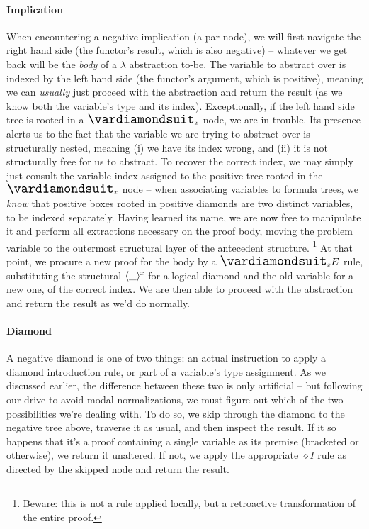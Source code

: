 \paragraph{Implication} When encountering a negative implication (a par node), we will first navigate the right hand side (the functor's result, which is also negative) -- whatever we get back will be the \textit{body} of a $\lambda$ abstraction to-be.
The variable to abstract over is indexed by the left hand side (the functor's argument, which is positive), meaning we can \textit{usually} just proceed with the abstraction and return the result (as we know both the variable's type and its index).
Exceptionally, if the left hand side tree is rooted in a $\dxdia{x}$ node, we are in trouble.
Its presence alerts us to the fact that the variable we are trying to abstract over is structurally nested, meaning (i) we have its index wrong, and (ii) it is not structurally free for us to abstract.
To recover the correct index, we may simply just consult the variable index assigned to the positive tree rooted in the $\dxdia{x}$ node -- when associating variables to formula trees, we \textit{know} that positive boxes rooted in positive diamonds are two distinct variables, to be indexed separately.
Having learned its name, we are now free to manipulate it and perform all extractions necessary on the proof body, moving the problem variable to the outermost structural layer of the antecedent structure.%
	\footnote{Beware: this is not a rule applied locally, but a retroactive transformation of the entire proof.}
At that point, we procure a new proof for the body by a $\dxdia{x}E$ rule, substituting the structural $\dbra{\_}{x}$ for a logical diamond and the old variable for a new one, of the correct index.
We are then able to proceed with the abstraction and return the result as we'd do normally.

\paragraph{Diamond} 
A negative diamond is one of two things: an actual instruction to apply a diamond introduction rule, or part of a variable's type assignment.
As we discussed earlier, the difference between these two is only artificial -- but following our drive to avoid modal normalizations, we must figure out which of the two possibilities we're dealing with.
To do so, we skip through the diamond to the negative tree above, traverse it as usual, and then inspect the result.
If it so happens that it's a proof containing a single variable as its premise (bracketed or otherwise), we return it unaltered.
If not, we apply the appropriate $\diamond I$ rule as directed by the skipped node and return the result.


